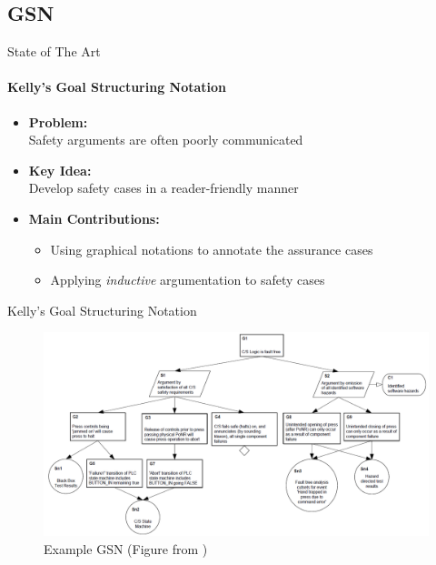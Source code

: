 \documentclass[xcolor=x11names,compress]{beamer}
\renewcommand{\(}{\begin{columns}}
\renewcommand{\)}{\end{columns}}
\newcommand{\<}[1]{\begin{column}{#1}}
\renewcommand{\>}{\end{column}}
\begin{document}
\subsection{GSN}
\begin{frame}{State of The Art}
\framesubtitle{Kelly's Goal Structuring Notation \cite{Kelly:GSN}}
\begin{itemize}
\item \textbf{Problem:}\\Safety arguments are often poorly communicated
\item \textbf{Key Idea:} \\Develop safety cases in a reader-friendly manner
\item \textbf{Main Contributions:}
\begin{itemize}
    \item Using graphical notations to annotate the assurance cases
    \item Applying \emph{inductive} argumentation to safety cases
\end{itemize}
\end{itemize}
\end{frame}


\begin{frame}{Kelly's Goal Structuring Notation}
\begin{figure}
\includegraphics[scale=0.3]{figures/gsn}
\caption{Example GSN (Figure from \cite{Kelly:GSN})}
\end{figure}
\end{frame}

\end{document}
